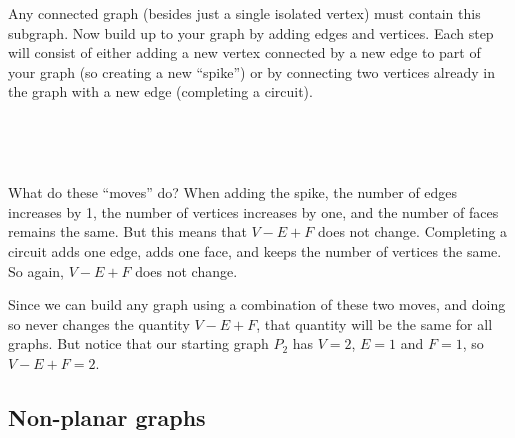 \documentclass[12pt]{article}
\begin{document}
Any connected graph (besides just a single isolated vertex) must contain this subgraph.  Now build up to your graph by adding edges and vertices.  Each step will consist of either adding a new vertex connected by a new edge to part of your graph (so creating a new ``spike'') or by connecting two vertices already in the graph with a new edge (completing a circuit).

\begin{center}
  ~ \hfill
  \hfill
  \hfill ~
\end{center}

What do these ``moves'' do?  When adding the spike, the number of edges increases by 1, the number of vertices increases by one, and the number of faces remains the same.  But this means that $V - E + F$ does not change.  Completing a circuit adds one edge, adds one face, and keeps the number of vertices the same.  So again, $V - E + F$ does not change.  

Since we can build any graph using a combination of these two moves, and doing so never changes the quantity $V - E + F$, that quantity will be the same for all graphs.  But notice that our starting graph $P_2$ has $V = 2$, $E = 1$ and $F = 1$, so $V - E + F = 2$.

\subsection{Non-planar graphs}
\end{document}
